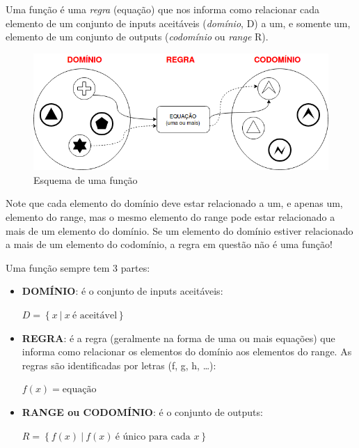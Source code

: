 \documentclass[pdftex, brazil, 12pt, twoside]{article}
\begin{document}
Uma função é uma \emph{regra} (equação) que nos informa como relacionar cada elemento
de um conjunto de inputs aceitáveis (\emph{domínio}, D) a um, e somente um,
elemento de um conjunto de outputs (\emph{codomínio} ou \emph{range} R).

\begin{figure}[H]
  \begin{center}
    \caption{Esquema de uma função}
    \label{fig:esquema-funcao}
    \includegraphics[scale=0.5]{imagens/esquema-funcao.png}
    
  \end{center}
\end{figure}

Note que cada elemento do domínio deve estar relacionado a um, e apenas um,
elemento do range, mas o mesmo elemento do range pode estar relacionado a
mais de um elemento do domínio. Se um elemento do domínio estiver relacionado
a mais de um elemento do codomínio, a regra em questão não é uma função!

Uma função sempre tem 3 partes:

\begin{itemize}
\item \textbf{DOMÍNIO}: é o conjunto de inputs aceitáveis:

  $D = \left\{x\ |\ x\ \text{é aceitável}\right\}$
\item \textbf{REGRA}: é a regra (geralmente na forma de uma ou mais equações)
  que informa como relacionar os elementos do domínio aos elementos do range.
  As regras são identificadas por letras (f, g, h, \ldots):

  $f(x) = \text{equação}$
\item \textbf{RANGE ou CODOMÍNIO}: é o conjunto de outputs:

  $R = \left\{f(x)\ |\ f(x)\ \text{é único para cada }x\right\}$
\end{itemize}
\end{document}
